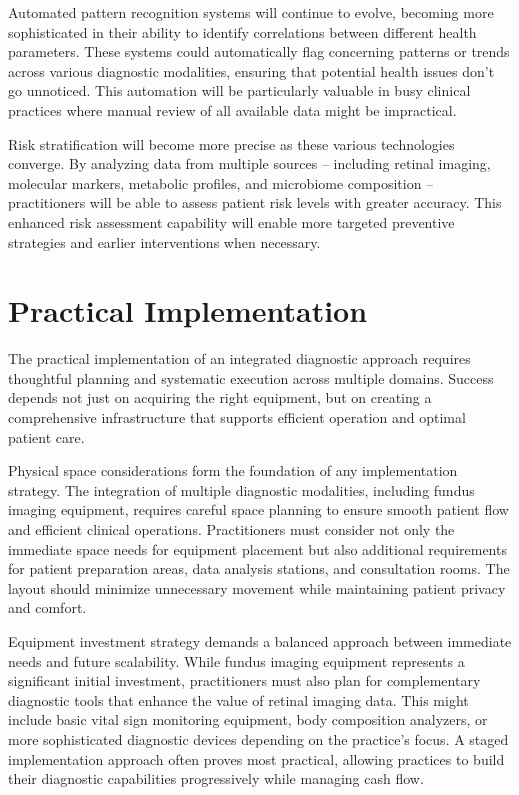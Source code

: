 \documentclass[
  Letterpaper,
]{scrbook}
\begin{document}
Automated pattern recognition systems will continue to evolve, becoming
more sophisticated in their ability to identify correlations between
different health parameters. These systems could automatically flag
concerning patterns or trends across various diagnostic modalities,
ensuring that potential health issues don't go unnoticed. This
automation will be particularly valuable in busy clinical practices
where manual review of all available data might be impractical.

Risk stratification will become more precise as these various
technologies converge. By analyzing data from multiple sources --
including retinal imaging, molecular markers, metabolic profiles, and
microbiome composition -- practitioners will be able to assess patient
risk levels with greater accuracy. This enhanced risk assessment
capability will enable more targeted preventive strategies and earlier
interventions when necessary.

\section{Practical Implementation}\label{practical-implementation-2}

The practical implementation of an integrated diagnostic approach
requires thoughtful planning and systematic execution across multiple
domains. Success depends not just on acquiring the right equipment, but
on creating a comprehensive infrastructure that supports efficient
operation and optimal patient care.

Physical space considerations form the foundation of any implementation
strategy. The integration of multiple diagnostic modalities, including
fundus imaging equipment, requires careful space planning to ensure
smooth patient flow and efficient clinical operations. Practitioners
must consider not only the immediate space needs for equipment placement
but also additional requirements for patient preparation areas, data
analysis stations, and consultation rooms. The layout should minimize
unnecessary movement while maintaining patient privacy and comfort.

Equipment investment strategy demands a balanced approach between
immediate needs and future scalability. While fundus imaging equipment
represents a significant initial investment, practitioners must also
plan for complementary diagnostic tools that enhance the value of
retinal imaging data. This might include basic vital sign monitoring
equipment, body composition analyzers, or more sophisticated diagnostic
devices depending on the practice's focus. A staged implementation
approach often proves most practical, allowing practices to build their
diagnostic capabilities progressively while managing cash flow.
\end{document}
